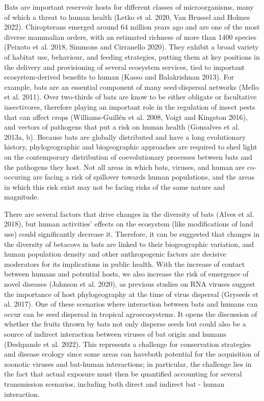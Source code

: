 \documentclass[11pt]{article}
\begin{document}
Bats are important reservoir hosts for different classes of
microorganisms, many of which a threat to human health (Letko et al.
2020, Van Brussel and Holmes 2022). Chiropterans emerged around 64
million years ago and are one of the most diverse mammalian orders, with
an estimated richness of more than 1400 species (Peixoto et al. 2018,
Simmons and Cirranello 2020). They exhibit a broad variety of habitat
use, behaviour, and feeding strategies, putting them at key positions in
the delivery and provisioning of several ecosystem services, tied to
important ecosystem-derived benefits to human (Kasso and Balakrishnan
2013). For example, bats are an essential component of many
seed-dispersal networks (Mello et al. 2011). Over two-thirds of bats are
know to be either obligate or facultative insectivores, therefore
playing an important role in the regulation of insect pests that can
affect crops (Williams-Guillén et al. 2008, Voigt and Kingston 2016),
and vectors of pathogens that put a risk on human health (Gonsalves et
al. 2013a, b). Because bats are globally distributed and have a long
evolutionary history, phylogeographic and biogeographic approaches are
required to shed light on the contemporary distribution of
coevolutionary processes between bats and the pathogens they host. Not
all areas in which bats, viruses, and human are co-occuring are facing a
risk of spillover towards human populations, and the areas in which this
risk exist may not be facing risks of the same nature and magnitude.

There are several factors that drive changes in the diversity of bats
(Alves et al. 2018), but human activities' effects on the ecosystem
(like modifications of land use) could significantly decrease it.
Therefore, it can be suggested that changes in the diversity of betacovs
in bats are linked to their biogeographic variation, and human
population density and other anthropogenic factors are decisive
moderators for its implications in public health. With the increase of
contact between humans and potential hosts, we also increase the risk of
emergence of novel diseases (Johnson et al. 2020), as previous studies
on RNA viruses suggest the importance of host phylogeography at the time
of virus dispersal (Gryseels et al. 2017). One of these scenarios where
interaction between bats and humans can occur can be seed dispersal in
tropical agroecosystems. It opens the discussion of whether the fruits
thrown by bats not only disperse seeds but could also be a source of
indirect interaction between viruses of bat origin and humans (Deshpande
et al. 2022). This represents a challenge for conservation strategies
and disease ecology since some areas can haveboth potential for the
acquisition of zoonotic viruses and bat-human interactions; in
particular, the challenge lies in the fact that actual exposure must
then be quantified accounting for several transmission scenarios,
including both direct and indirect bat - human interaction.
\end{document}
